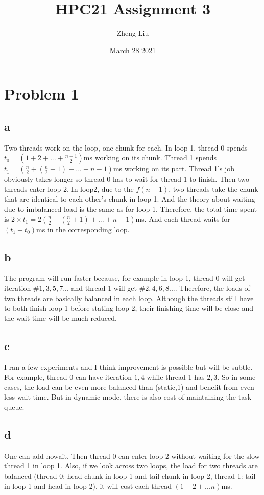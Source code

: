 \documentclass{article}
\title{HPC21 Assignment 3}
\author{Zheng Liu}
\date{March 28 2021}
\begin{document}
\maketitle

\section{Problem 1}
\subsection{a}
Two threads work on the loop, one chunk for each. In loop 1, thread 0 spends $t_0 =(1+2+...+\frac{n-1}{2})$ms working on its chunk. Thread 1 spends $t_1=(\frac{n}{2}+(\frac{n}{2}+1) + ... + n-1)$ms working on its part. Thread 1's job obviously takes longer so thread 0 has to wait for thread 1 to finish. Then two threads enter loop 2. In loop2, due to the $f(n-1)$, two threads take the chunk that are identical to each other's chunk in loop 1. And the theory about waiting due to imbalanced load is the same as for loop 1. Therefore, the total time spent is $2\times t_1 = 2(\frac{n}{2}+(\frac{n}{2}+1) + ... + n-1)$ms. And each thread waits for $(t_1-t_0)$ms in the corresponding loop.

\subsection{b}
The program will run faster because, for example in loop 1, thread 0 will get iteration \#$1,3,5,7...$ and thread 1 will get \#$2,4,6,8...$. Therefore, the loads of two threads are basically balanced in each loop. Although the threads still have to both finish loop 1 before stating loop 2, their finishing time will be close and the wait time will be much reduced.

\subsection{c}
I ran a few experiments and I think improvement is possible but will be subtle. For example, thread 0 can have iteration $1,4$ while thread 1 has $2,3$. So in some cases, the load can be even more balanced than (static,1) and benefit from even less wait time. But in dynamic mode, there is also cost of maintaining the task queue. 

\subsection{d}
One can add nowait. Then thread 0 can enter loop 2 without waiting for the slow thread 1 in loop 1. Also, if we look across two loops, the load for two threads are balanced (thread 0: head chunk in loop 1 and tail chunk in loop 2, thread 1: tail in loop 1 and head in loop 2). it will cost each thread $(1+2+...n)$ms. 
    
\end{document}
